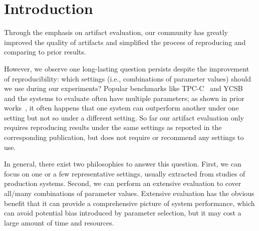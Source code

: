 \section{Introduction}

Through the emphasis on artifact evaluation, our community has greatly
improved the quality of artifacts and simplified the process of reproducing and comparing to prior results.

However, we observe one long-lasting question persists despite the
improvement of reproducibility: which settings (i.e., combinations of parameter values) should we use
during our experiments? Popular benchmarks like TPC-C~\cite{tpccurl} and YCSB~\cite{ycsburl,Cooper2010YCSB}
and the systems to evaluate often have multiple parameters; as shown in prior works~\cite{Harding2017EvalDistributed,Wu2017EvalMem,Lim2017Cicada,Lu2020Aria}, 
it often happens that one system can outperform another under one setting
but not so under a different setting.
So far our artifact evaluation only requires reproducing results under the
same settings as reported in the corresponding publication, but does not
require or recommend any settings to use.

In general, there exist two philosophies to answer this question. First, we can focus on one or a few
representative settings, usually extracted from studies of production systems. 
Second, we can
perform an extensive evaluation to cover all/many combinations of parameter values.
Extensive evaluation has the obvious benefit that it can provide a comprehensive
picture of system performance, which can avoid potential bias introduced by
parameter selection, but it may cost a large amount of time and resources.


